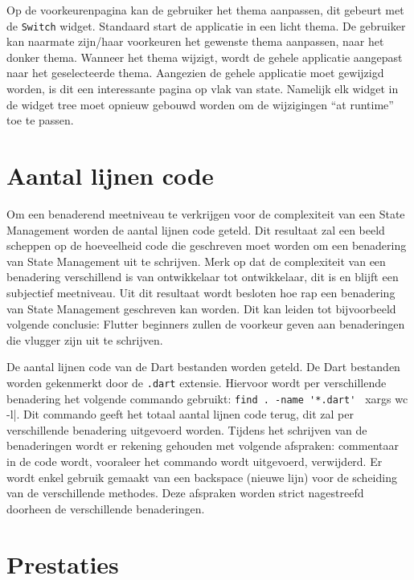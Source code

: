 Op de voorkeurenpagina kan de gebruiker het thema aanpassen, dit gebeurt met de \verb|Switch| widget. Standaard start de applicatie in een licht thema. De gebruiker kan naarmate zijn/haar voorkeuren het gewenste thema aanpassen, naar het donker thema.\newline
Wanneer het thema wijzigt, wordt de gehele applicatie aangepast naar het geselecteerde thema. Aangezien de gehele applicatie moet gewijzigd worden, is dit een interessante pagina op vlak van state. Namelijk elk widget in de widget tree moet opnieuw gebouwd worden om de wijzigingen ``at runtime'' toe te passen.




\section{Aantal lijnen code}
\label{ch:loc}
Om een benaderend meetniveau te verkrijgen voor de complexiteit van een State Management worden de aantal lijnen code geteld. Dit resultaat zal een beeld scheppen op de hoeveelheid code die geschreven moet worden om een benadering van State Management uit te schrijven. Merk op dat de complexiteit van een benadering verschillend is van ontwikkelaar tot ontwikkelaar, dit is en blijft een subjectief meetniveau. Uit dit resultaat wordt besloten hoe rap een benadering van State Management geschreven kan worden. Dit kan leiden tot bijvoorbeeld volgende conclusie: Flutter beginners zullen de voorkeur geven aan benaderingen die vlugger zijn uit te schrijven. 

De aantal lijnen code van de Dart bestanden worden geteld. De Dart bestanden worden gekenmerkt door de \verb|.dart| extensie. Hiervoor wordt per verschillende benadering het volgende commando gebruikt: \verb|find . -name '*.dart' | xargs wc -l|. Dit commando geeft het totaal aantal lijnen code terug, dit zal per verschillende benadering uitgevoerd worden. \newline 
Tijdens het schrijven van de benaderingen wordt er rekening gehouden met volgende afspraken: commentaar in de code wordt, vooraleer het commando wordt uitgevoerd, verwijderd. Er wordt enkel gebruik gemaakt van een backspace (nieuwe lijn) voor de scheiding van de verschillende methodes. Deze afspraken worden strict nagestreefd doorheen de verschillende benaderingen.

\section{Prestaties}
\label{ch:prestaties}
